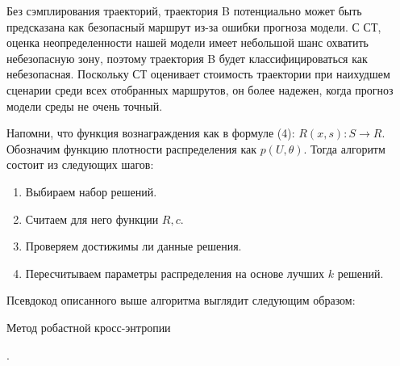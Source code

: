 Без сэмплирования траекторий, траектория B потенциально может быть предсказана как безопасный маршрут из-за ошибки прогноза модели.  С СТ,
оценка неопределенности нашей модели имеет небольшой
шанс охватить небезопасную зону, поэтому траектория B будет
классифицироваться как небезопасная. Поскольку СТ оценивает стоимость
траектории при наихудшем сценарии среди всех отобранных маршрутов, он более надежен, когда прогноз модели среды не очень точный.


Напомни, что функция вознаграждения как в формуле (4): $R(x, s) : S \to R$. Обозначим функцию плотности распределения как $p(U, \theta)$. 
Тогда алгоритм состоит из следующих шагов: 
\begin{enumerate}
	\item Выбираем набор решений.
	\item Считаем для него функции $R, c$.
	\item Проверяем достижимы ли данные решения. 
	\item Пересчитываем параметры распределения на основе лучших $k$ решений.
\end{enumerate}

Псевдокод описанного выше алгоритма выглядит следующим образом: 
\begin{algorithm}
	\caption{Метод робастной кросс-энтропии}\label{cem}
	\begin{algorithmic}[1]
		
		\Else{}
		.
		\EndIf
		\EndWhile
	\end{algorithmic}
\end{algorithm}
\bigskip


